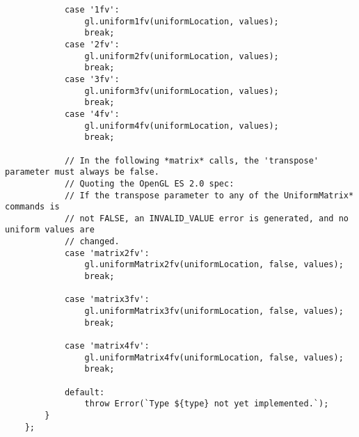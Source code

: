 {\begin{lstlisting}
            case '1fv':
                gl.uniform1fv(uniformLocation, values);
                break;
            case '2fv':
                gl.uniform2fv(uniformLocation, values);
                break;
            case '3fv':
                gl.uniform3fv(uniformLocation, values);
                break;
            case '4fv':
                gl.uniform4fv(uniformLocation, values);
                break;
    
            // In the following *matrix* calls, the 'transpose' parameter must always be false. 
            // Quoting the OpenGL ES 2.0 spec:
            // If the transpose parameter to any of the UniformMatrix* commands is
            // not FALSE, an INVALID_VALUE error is generated, and no uniform values are
            // changed.
            case 'matrix2fv':
                gl.uniformMatrix2fv(uniformLocation, false, values);
                break;
    
            case 'matrix3fv':
                gl.uniformMatrix3fv(uniformLocation, false, values);
                break;
    
            case 'matrix4fv':
                gl.uniformMatrix4fv(uniformLocation, false, values);
                break;
    
            default:
                throw Error(`Type ${type} not yet implemented.`);
        }
    };
    

\end{lstlisting}}
